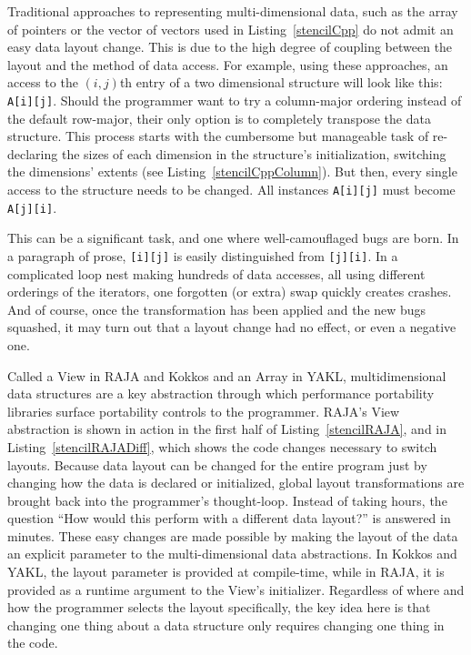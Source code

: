 Traditional approaches to representing multi-dimensional data, such as the array of pointers or the vector of vectors used in Listing~\ref{stencilCpp} do not admit an easy data layout change.
This is due to the high degree of coupling between the layout and the method of data access. 
For example, using these approaches, an access to the $(i,j)$th entry of a two dimensional structure will look like this: \verb.A[i][j]..
Should the programmer want to try a column-major ordering instead of the default row-major, their only option is to completely transpose the data structure.
This process starts with the cumbersome but manageable task of re-declaring the sizes of each dimension in the structure's initialization, switching the dimensions' extents (see Listing~\ref{stencilCppColumn}).
But then, every single access to the structure needs to be changed. 
All instances \verb.A[i][j]. must become \verb.A[j][i]..

This can be a significant task, and one where well-camouflaged bugs are born. 
In a paragraph of prose, \verb.[i][j]. is easily distinguished from \verb.[j][i]..
In a complicated loop nest making hundreds of data accesses, all using different orderings of the iterators, one forgotten (or extra) swap quickly creates crashes.
And of course, once the transformation has been applied and the new bugs squashed, it may turn out that a layout change had no effect, or even a negative one.

Called a View in RAJA and Kokkos and an Array in YAKL, multidimensional data structures are a key abstraction through which performance portability libraries surface portability controls to the programmer.
RAJA's View abstraction is shown in action in the first half of Listing~\ref{stencilRAJA}, and in Listing~\ref{stencilRAJADiff}, which shows the code changes necessary to switch layouts.
Because data layout can be changed for the entire program just by changing how the data is declared or initialized, global layout transformations are brought back into the programmer's thought-loop.
Instead of taking hours, the question ``How would this perform with a different data layout?'' is answered in minutes.
These easy changes are made possible by making the layout of the data an explicit parameter to the multi-dimensional data abstractions.
In Kokkos and YAKL, the layout parameter is provided at compile-time, while in RAJA, it is provided as a runtime argument to the View's initializer.
Regardless of where and how the programmer selects the layout specifically, the key idea here is that changing one thing about a data structure only requires changing one thing in the code.

